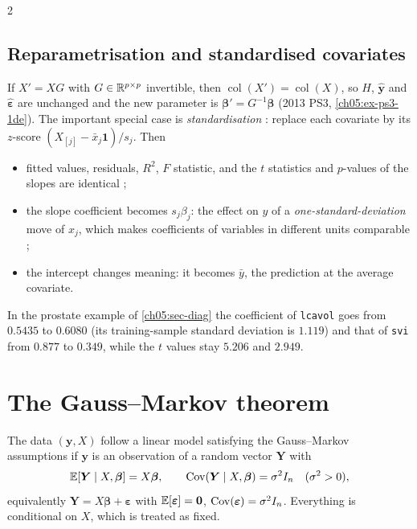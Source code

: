 \begin{paracol}{2}
\subsection{Reparametrisation and standardised covariates}\label{ch05:sec-standard}
If $X'=XG$ with $G\in\mathbb{R}^{p\times p}$ invertible, then $\operatorname{col}(X')=\operatorname{col}(X)$, so $H$, $\hat{\bm y}$ and
$\hat{\bm\varepsilon}$ are unchanged and the new parameter is $\bm\beta'=G^{-1}\bm\beta$ (2013 PS3, \cref{ch05:ex-ps3-1de}).
The important special case is \emph{standardisation} : replace each covariate by its
$z$-score $(X_{[j]}-\bar x_j\bm 1)/s_j$. Then
\begin{itemize}
  \item fitted values, residuals, $R^2$, $F$ statistic, and the $t$ statistics and $p$-values of the slopes are
        identical ;
  \item the slope coefficient becomes $s_j\beta_j$: the effect on $y$ of a \emph{one-standard-deviation} move
        of $x_j$, which makes coefficients of variables in different units comparable ;
  \item the intercept changes meaning: it becomes $\bar y$, the prediction at the average covariate.
\end{itemize}
In the prostate example of \cref{ch05:sec-diag} the coefficient of \texttt{lcavol} goes from $0.5435$ to
$0.6080$ (its training-sample standard deviation is $1.119$) and that of \texttt{svi} from $0.877$ to
$0.349$, while the $t$ values stay $5.206$ and $2.949$.

\section{The Gauss--Markov theorem}\label{ch05:sec-gm}

\begin{definition}
The data $(\bm y,X)$ follow a linear model satisfying the Gauss--Markov assumptions if $\bm y$ is an
observation of a random vector $\bm Y$ with  
\[
  \mathbb{E}[\bm Y\mid X,\bm\beta]=X\bm\beta,\qquad \operatorname{Cov}(\bm Y\mid X,\bm\beta)=\sigma^2I_n\quad(\sigma^2>0),
\]
equivalently $\bm Y=X\bm\beta+\bm\varepsilon$ with $\mathbb{E}[\bm\varepsilon]=\bm 0$, $\operatorname{Cov}(\bm\varepsilon)=\sigma^2I_n$. Everything is conditional
on $X$, which is treated as fixed.
\end{definition}


\end{paracol}

